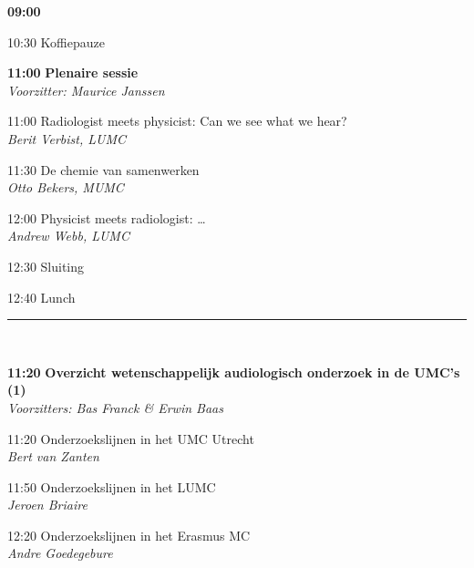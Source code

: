 \documentclass[a4paper,10pt]{report}
\begin{document}
\begin{multicols*}{3}
\columnbreak


\begin{packed_enum}

\item[{\color{Blue} {\textbf{09:00}}}]{}
        \vfill
\item[10:30] Koffiepauze
        \vfill
\item[\textbf{11:00}] {\textbf{Plenaire sessie}}\\\textit{Voorzitter: Maurice Janssen}
\item[11:00] Radiologist meets physicist: Can we see what we hear?\\\textit{Berit Verbist, LUMC}
\item[11:30] De chemie van samenwerken\\\textit{Otto Bekers, MUMC}
\item[12:00] Physicist meets radiologist: \ldots\\\textit{Andrew Webb, LUMC}
        \vfill
\item[12:30] Sluiting
\item[12:40] Lunch

\end{packed_enum}

\hrule \vspace{3mm}
\vfill
{}\\

\begin{packed_enum}
\item[\textbf{11:20}] {\textbf{Overzicht wetenschappelijk audiologisch
    onderzoek in de UMC's (1)}}\\\textit{Voorzitters: Bas Franck \& Erwin Baas}
\item[11:20] Onderzoekslijnen in het UMC Utrecht\\\textit{Bert van Zanten}
\item[11:50] Onderzoekslijnen in het LUMC\\\textit{Jeroen Briaire}
\item[12:20] Onderzoekslijnen in het Erasmus MC\\\textit{Andre Goedegebure}
\end{packed_enum}


\end{multicols*}
\end{document}
